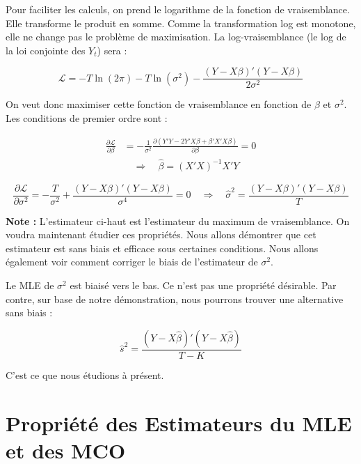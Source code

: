 \documentclass[14pt]{extarticle} %
\begin{document}
Pour faciliter les calculs, on prend le logarithme de la fonction de vraisemblance. Elle transforme le produit en somme. Comme la transformation log est monotone, elle ne change pas le problème de maximisation. La log-vraisemblance (le log de la loi conjointe des \(Y_t\)) sera :

\begin{equation*}
\mathcal{L} = -T \ln(2\pi) - T \ln(\sigma^2) - \frac{(Y - X\beta)'(Y - X\beta)}{2\sigma^2}
\end{equation*}

On veut donc maximiser cette fonction de vraisemblance en fonction de \(\beta\) et \(\sigma^2\). Les conditions de premier ordre sont :

\begin{align*}
\frac{\partial \mathcal{L}}{\partial \beta} &= -\frac{1}{\sigma^2} \frac{\partial (Y'Y - 2Y'X\beta + \beta'X'X\beta)}{\partial \beta} = 0 \\
&\quad \Rightarrow \quad \hat{\beta} = (X'X)^{-1}X'Y
\end{align*}

\begin{equation*}
\frac{\partial \mathcal{L}}{\partial \sigma^2} = -\frac{T}{\sigma^2} + \frac{(Y - X\beta)'(Y - X\beta)}{\sigma^4} = 0 \quad \Rightarrow \quad \hat{\sigma}^2 = \frac{(Y - X\beta)'(Y - X\beta)}{T}
\end{equation*}

\textbf{Note :} L’estimateur ci-haut est l’estimateur du maximum de vraisemblance. On voudra maintenant étudier ces propriétés. Nous allons démontrer que cet estimateur est sans biais et efficace sous certaines conditions. Nous allons également voir comment corriger le biais de l'estimateur de \(\sigma^2\).

Le MLE de \(\sigma^2\) est biaisé vers le bas. Ce n’est pas une propriété désirable. Par contre, sur base de notre démonstration, nous pourrons trouver une alternative sans biais :

\begin{equation*}
\hat{s}^2 = \frac{(Y - X\hat{\beta})'(Y - X\hat{\beta})}{T - K}
\end{equation*}

C’est ce que nous étudions à présent.

\section{Propriété des Estimateurs du MLE et des MCO}
\end{document}
